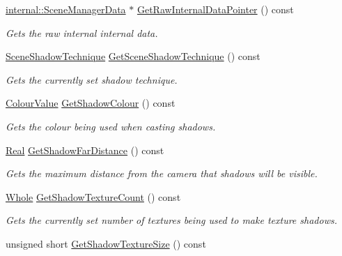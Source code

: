\begin{DoxyCompactItemize}
\hyperlink{classMezzanine_1_1internal_1_1SceneManagerData}{internal::SceneManagerData} $\ast$ \hyperlink{classMezzanine_1_1SceneManager_a1acfb4dbc4005a3bd3f673534b6edec8}{GetRawInternalDataPointer} () const 
\begin{DoxyCompactList}\small\item\em Gets the raw internal internal data. \item\end{DoxyCompactList}\item 
\hyperlink{classMezzanine_1_1SceneManager_a8149cd1ec188e0d57935d71c6a7134c6}{SceneShadowTechnique} \hyperlink{classMezzanine_1_1SceneManager_a87b4d1dabaf1acffc55b95609d14817e}{GetSceneShadowTechnique} () const 
\begin{DoxyCompactList}\small\item\em Gets the currently set shadow technique. \item\end{DoxyCompactList}\item 
\hyperlink{classMezzanine_1_1ColourValue}{ColourValue} \hyperlink{classMezzanine_1_1SceneManager_aeaba5d32f77249821ec4ec85cecb1522}{GetShadowColour} () const 
\begin{DoxyCompactList}\small\item\em Gets the colour being used when casting shadows. \item\end{DoxyCompactList}\item 
\hyperlink{namespaceMezzanine_a726731b1a7df72bf3583e4a97282c6f6}{Real} \hyperlink{classMezzanine_1_1SceneManager_a244de596b02c103c4b2cb2417bd8fdbb}{GetShadowFarDistance} () const 
\begin{DoxyCompactList}\small\item\em Gets the maximum distance from the camera that shadows will be visible. \item\end{DoxyCompactList}\item 
\hyperlink{namespaceMezzanine_adcbb6ce6d1eb4379d109e51171e2e493}{Whole} \hyperlink{classMezzanine_1_1SceneManager_aa863b17f316b6b29592b4be50136b543}{GetShadowTextureCount} () const 
\begin{DoxyCompactList}\small\item\em Gets the currently set number of textures being used to make texture shadows. \item\end{DoxyCompactList}\item 
unsigned short \hyperlink{classMezzanine_1_1SceneManager_aece91693b0d176d0c6ec80f3384ee834}{GetShadowTextureSize} () const 

\end{DoxyCompactItemize}
